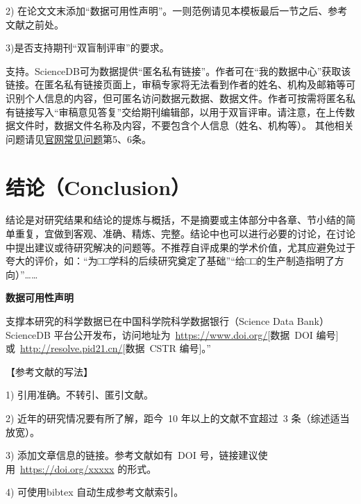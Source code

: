 \documentclass{JQRnew}
\begin{document}
2) 在论文文末添加“数据可用性声明”。一则范例请见本模板最后一节之后、参考文献之前处。

3)是否支持期刊“双盲制评审”的要求。

	支持。ScienceDB可为数据提供“匿名私有链接”。作者可在“我的数据中心”获取该链接。在匿名私有链接页面上，审稿专家将无法看到作者的姓名、机构及邮箱等可识别个人信息的内容，但可匿名访问数据元数据、数据文件。作者可按需将匿名私有链接写入“审稿意见答复”交给期刊编辑部，以用于双盲评审。请注意，在上传数据文件时，数据文件名称及内容，不要包含个人信息（姓名、机构等）。
其他相关问题请见\href{https://www.scidb.cn/help?p=faq}{\color{blue}官网常见问题}第5、6条。


\section{结论（Conclusion）}

结论是对研究结果和结论的提炼与概括，不是摘要或主体部分中各章、节小结的简单重复，宜做到客观、准确、精炼、完整。结论中也可以进行必要的讨论，在讨论中提出建议或待研究解决的问题等。不推荐自评成果的学术价值，尤其应避免过于夸大的评价，如：“为□□学科的后续研究奠定了基础”“给□□的生产制造指明了方向）”……


\noindent
\textbf{数据可用性声明}

支撑本研究的科学数据已在中国科学院科学数据银行（Science Data
Bank）ScienceDB 平台公开发布，访问地址为~\url{https://www.doi.org/}[数据~DOI 编号]或~\url{http://resolve.pid21.cn/}[数据~CSTR 编号]。''

【参考文献的写法】

1) 引用准确。不转引、匿引文献。

2) 近年的研究情况要有所了解，距今~10 年以上的文献不宜超过~3 条（综述适当放宽）。

3) 添加文章信息的链接。参考文献如有~DOI 号，链接建议使用~\url{https://doi.org/xxxxx} 的形式。

4) 可使用bibtex 自动生成参考文献索引。

% 
% 
\end{document}
